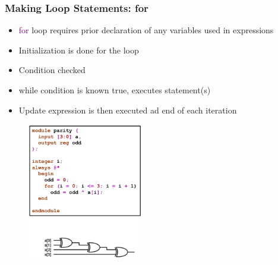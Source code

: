 \documentclass[t, notes, xcolor=table]{beamer}
\begin{document}
\begin{frame}
\frametitle{Making Loop Statements: for}
\scriptsize{
\begin{multicols}{2}
\begin{itemize}
\item \textcolor{purple}{for} loop requires prior declaration of any variables used in expressions
\item Initialization is done for the loop
\item Condition checked
\item while condition is known true, executes statement(s)
\item Update expression is then executed ad end of each iteration
\end{itemize}
\vfill
\columnbreak
\begin{figure}
    \includegraphics[width=0.45\textwidth]{img/06_for.png}
\end{figure}
\end{multicols}
}
\end{frame}
\end{document}
